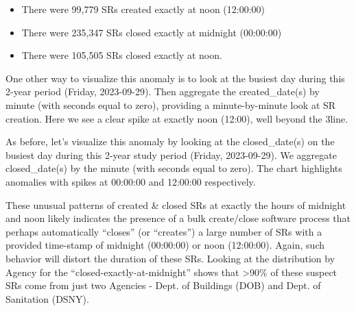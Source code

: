 \documentclass[12pt, titlepage]{article}
\begin{document}
	
\begin{itemize}
	 \item There were 99,779 SRs created exactly at noon (12:00:00)
	 \item There were 235,347 SRs closed exactly at midnight (00:00:00)
	\item There were 105,505 SRs closed exactly at noon. 
\end{itemize}


One other way to visualize this anomaly is to look at the busiest day 
during this 2-year period (Friday, 2023-09-29). Then aggregate 
the created\_date(s) by minute (with seconds equal to zero), providing
a minute-by-minute look at SR creation. Here we see a clear 
spike at exactly noon (12:00), well beyond the 3\textsigma line.



As before, let's visualize this anomaly by looking at the closed\_date(s) 
on the busiest day during this 2-year study period (Friday, 2023-09-29). 
We aggregate closed\_date(s) by the minute (with seconds equal to zero). 
The chart highlights anomalies with spikes at 00:00:00 and 
12:00:00 respectively. 




These unusual patterns of created \& closed SRs at exactly the hours 
of midnight and noon likely indicates the presence of a bulk create/close 
software process that perhaps automatically ``closes'' 
(or ``creates'') a large number of SRs with a provided time-stamp of 
midnight (00:00:00) or noon (12:00:00). Again, such behavior will
distort the duration of these SRs. Looking at the distribution 
by Agency for the ``closed-exactly-at-midnight'' 
shows that \textgreater90\% of these suspect SRs come from just two 
Agencies - Dept. of Buildings (DOB) and Dept. of Sanitation (DSNY). 

	
\end{document}
